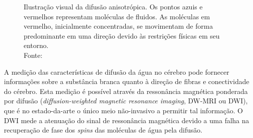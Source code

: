\documentclass[
    12pt,                %
    oneside,            %
    a4paper,            %
    english,            %
    french,                %
    spanish,            %
    brazil                %
    ]{abntex2}
\begin{document}
\begin{figure}[ht]
\centering
\captionsetup[subfloat]{farskip=0pt,nearskip=0pt}
    \caption{Ilustração visual da difusão anisotrópica. Os pontos azuis e vermelhos representam moléculas de fluidos. As moléculas em vermelho, inicialmente concentradas, se movimentam de forma predominante em uma direção devido às restrições físicas em seu entorno. \\ Fonte: \cite{voltoline2016}
    }
    \label{fig::intro_difusao_anisotropica}
\end{figure}



A medição das características de difusão da água no cérebro pode fornecer informações sobre a substância branca quanto à direção de fibras e conectividade do cérebro. Esta medição é possível através da ressonância magnética ponderada por difusão (\textit{diffusion-weighted magnetic resonance imaging}, DW-MRI ou DWI), que é no estado-da-arte o único meio não-invasivo a permitir tal informação. O DWI mede a atenuação do sinal de ressonância magnética devido a uma falha na recuperação de fase dos \textit{spins} das moléculas de água pela difusão.
\end{document}
